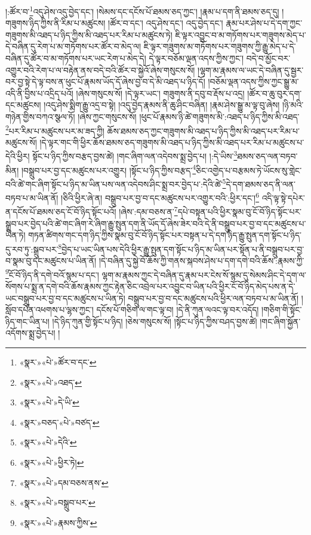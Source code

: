 །:ཚོར་བ་\footnote{«སྣར་»«པེ་»ཚོར་བ་དང་}འདུ་ཤེས་འདུ་བྱེད་དང་། །སེམས་དང་དངོས་པོ་ཐམས་ཅད་ཀྱང་། །རྣམ་པ་དག་ནི་ཐམས་ཅད་དུ། །གཟུགས་ཉིད་ཀྱིས་ནི་རིམ་པ་མཚུངས། །ཚོར་བ་དང་། འདུ་ཤེས་དང་། འདུ་བྱེད་དང་། རྣམ་པར་ཤེས་པ་དེ་དག་ཀྱང་གཟུགས་མི་འཐད་པ་ཉིད་ཀྱིས་མི་འཐད་པར་རིམ་པ་མཚུངས་ཏེ། ཇི་ལྟར་འབྱུང་བ་མ་གཏོགས་པར་གཟུགས་མེད་པ་དེ་བཞིན་དུ་རེག་པ་མ་གཏོགས་པར་ཚོར་བ་མེད་ལ། ཇི་ལྟར་གཟུགས་མ་གཏོགས་པར་གཟུགས་ཀྱི་རྒྱུ་མེད་པ་དེ་བཞིན་དུ་ཚོར་བ་མ་གཏོགས་པར་ཡང་རེག་པ་མེད་དེ། དེ་ལྟར་བཅོམ་ལྡན་འདས་ཀྱིས་ཀྱང་། བདེ་བ་མྱོང་བར་འགྱུར་བའི་རེག་པ་ལ་བརྟེན་ནས་བདེ་བའི་ཚོར་བ་སྐྱེའོ་ཞེས་གསུངས་སོ། །ལྷག་མ་རྣམས་ལ་ཡང་དེ་བཞིན་དུ་སྦྱར་བར་བྱ་སྟེ་དེ་ལྟ་བས་ན་ཕུང་པོ་རྣམས་ཡོད་དོ་ཞེས་བྱ་བ་དེ་མི་འཐད་པ་ཉིད་དོ། །བཅོམ་ལྡན་འདས་ཀྱིས་ཀྱང་སྒྱུ་མ་འདི་ནི་བྱིས་པ་འདྲིད་པའོ། །ཞེས་གསུངས་སོ། །དེ་ལྟར་ཡང་། གཟུགས་ནི་དབུ་བ་རྡོས་པ་འདྲ། །ཚོར་བ་ཆུ་བུར་དག་དང་མཚུངས། །འདུ་ཤེས་སྨིག་རྒྱུ་འདྲ་བ་སྟེ། །འདུ་བྱེད་རྣམས་ནི་ཆུ་ཤིང་བཞིན། །རྣམ་ཤེས་སྒྱུ་མ་ལྟ་བུ་ཞེས། །ཉི་མའི་གཉེན་གྱིས་བཀའ་སྩལ་ཏོ། །ཞེས་ཀྱང་གསུངས་སོ། །ཕུང་པོ་རྣམས་ཉི་ཚེ་གཟུགས་མི་:འཐད་པ་ཉིད་ཀྱིས་མི་འཐད་\footnote{«སྣར་»«པེ་»འཐད་}པར་རིམ་པ་མཚུངས་པར་མ་ཟད་ཀྱི། ཆོས་ཐམས་ཅད་ཀྱང་གཟུགས་མི་འཐད་པ་ཉིད་ཀྱིས་མི་འཐད་པར་རིམ་པ་མཚུངས་སོ། །དེ་ལྟར་གང་གི་ཕྱིར་ཆོས་ཐམས་ཅད་གཟུགས་མི་འཐད་པ་ཉིད་ཀྱིས་མི་འཐད་པར་རིམ་པ་མཚུངས་པ་དེའི་ཕྱིར། སྟོང་པ་ཉིད་ཀྱིས་བརྩད་བྱས་ཚེ། །གང་ཞིག་ལན་འདེབས་སྨྲ་བྱེད་པ། །:དེ་ཡིས་\footnote{«སྣར་»«པེ་»དེ་ཡི་}ཐམས་ཅད་ལན་བཏབ་མིན། །བསྒྲུབ་པར་བྱ་དང་མཚུངས་པར་འགྱུར། །སྟོང་པ་ཉིད་ཀྱིས་བརྩད་\footnote{«སྣར་»བཅད་«པེ་»བཙད་}ཅིང་འགྱེད་པ་བརྩམས་ཏེ་ཡོངས་སུ་གླེང་བའི་ཚེ་གང་ཞིག་སྟོང་པ་ཉིད་མ་ཡིན་པས་ལན་འདེབས་ཤིང་སྨྲ་བར་བྱེད་པ་:དེའི་ཚེ་\footnote{«སྣར་»«པེ་»དེའི་}དེ་དག་ཐམས་ཅད་ནི་ལན་བཏབ་པ་མ་ཡིན་ནོ། །ཅིའི་ཕྱིར་ཞེ་ན། བསྒྲུབ་པར་བྱ་བ་དང་མཚུངས་པར་འགྱུར་བའི་:ཕྱིར་དང་།\footnote{«སྣར་»«པེ་»ཕྱིར་ཏེ།} འདི་ལྟ་སྟེ་དཔེར་ན་དངོས་པོ་ཐམས་ཅད་ངོ་བོ་ཉིད་སྟོང་པའོ། །ཞེས་:དམ་བཅས་ན་\footnote{«སྣར་»«པེ་»དམ་བཅས་ནས་}དཔེ་བསྟན་པའི་ཕྱིར་སྣམ་བུ་ངོ་བོ་ཉིད་སྟོང་པར་སྒྲུབ་པར་བྱེད་པའི་ཚེ་གང་ཞིག་རེ་ཞིག་རྒྱུ་སྤུན་དག་ནི་ཡོད་དོ་ཞེས་ཟེར་བའི་དེ་ནི་བསྒྲུབ་པར་བྱ་བ་དང་མཚུངས་པ་ཡིན་ཏེ། གཏན་ཚིགས་གང་དག་ཉིད་ཀྱིས་སྣམ་བུ་ངོ་བོ་ཉིད་སྟོང་པར་བསྟན་པ་དེ་དག་ཉིད་རྒྱུ་སྤུན་དག་སྟོང་པ་ཉིད་དུ་རབ་ཏུ་:སྒྲུབ་པར་\footnote{«སྣར་»«པེ་»བསྒྲུབ་པར་}བྱེད་པ་ཡང་ཡིན་པས་དེའི་ཕྱིར་རྒྱུ་སྤུན་དག་སྟོང་པ་ཉིད་མ་ཡིན་པར་སྟོན་པ་ནི་བསྒྲུབ་པར་བྱ་བ་སྣམ་བུ་དང་མཚུངས་པ་ཡིན་ནོ། །དེ་བཞིན་དུ་སྐྱེ་བོ་ཆོས་ཀྱི་གནས་སྐབས་ཤེས་པ་དག་དགེ་བའི་ཆོས་:རྣམས་ཀྱི་\footnote{«སྣར་»«པེ་»རྣམས་ཀྱིས་}ངོ་བོ་ཉིད་ནི་དགེ་བའོ་སྙམ་པ་དང་། ལྷག་མ་རྣམས་ཀྱང་དེ་བཞིན་དུ་རྣམ་པར་ངེས་སོ་སྙམ་དུ་སེམས་ཤིང་དེ་དག་ལ་སོགས་པ་སྨྲ་ན་དགེ་བའི་ཆོས་རྣམས་ཀྱང་རྟེན་ཅིང་འབྲེལ་པར་འབྱུང་བ་ཡིན་པའི་ཕྱིར་ངོ་བོ་ཉིད་མེད་པས་ན་དེ་ཡང་བསྒྲུབ་པར་བྱ་བ་དང་མཚུངས་པ་ཡིན་ཏེ། བསྒྲུབ་པར་བྱ་བ་དང་མཚུངས་པའི་ཕྱིར་ལན་བཏབ་པ་མ་ཡིན་ནོ། །སློབ་དཔོན་འཕགས་པ་ལྷས་ཀྱང་། དངོས་པོ་གཅིག་ལ་གང་ལྟ་བ། །དེ་ནི་ཀུན་ལའང་ལྟ་བར་འདོད། །གཅིག་གི་སྟོང་ཉིད་གང་ཡིན་པ། །དེ་ཉིད་ཀུན་གྱི་སྟོང་པ་ཉིད། །ཅེས་གསུངས་སོ། །སྟོང་པ་ཉིད་ཀྱིས་བཤད་བྱས་ཚེ། །གང་ཞིག་སྐྱོན་འདོགས་སྨྲ་བྱེད་པ། །
